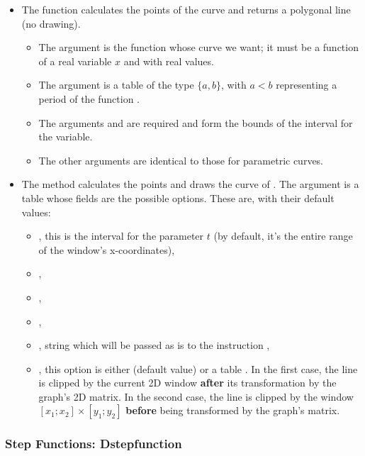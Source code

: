 \begin{itemize}
    \item The function  calculates the points of the curve and returns a polygonal line (no drawing).

\begin{itemize}
    \item The argument  is the function whose curve we want; it must be a function of a real variable $x$ and with real values.
    \item The argument  is a table of the type $\{a,b\}$, with \(a<b\) representing a period of the function .
    \item The arguments  and  are required and form the bounds of the interval for the variable.
    \item The other arguments are identical to those for parametric curves.
\end{itemize}
    \item The method  calculates the points and draws the curve of . The argument  is a table whose fields are the possible options. These are, with their default values:

\begin{itemize}
    \item {}, this is the interval for the parameter $t$ (by default, it's the entire range of the window's x-coordinates),
    \item {}, 
    \item {},
    \item {},
    \item {}, string which will be passed as is to the instruction \drawcmd,
    \item {}, this option is either \nil (default value) or a table . In the first case, the line is clipped by the current 2D window \textbf{after} its transformation by the graph's 2D matrix. In the second case, the line is clipped by the window $[x_1;x_2]\times[y_1;y_2]$ \textbf{before} being transformed by the graph's matrix.
\end{itemize}
\end{itemize}

\subsubsection{Step Functions: Dstepfunction}

